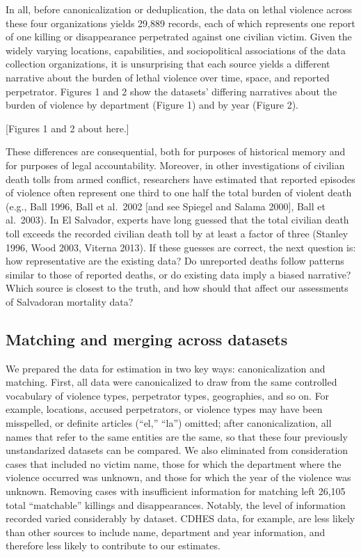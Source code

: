 \documentclass[11pt,]{article}
\begin{document}
In all, before canonicalization or deduplication, the data on lethal
violence across these four organizations yields 29,889 records, each of
which represents one report of one killing or disappearance perpetrated
against one civilian victim. Given the widely varying locations,
capabilities, and sociopolitical associations of the data collection
organizations, it is unsurprising that each source yields a different
narrative about the burden of lethal violence over time, space, and
reported perpetrator. Figures 1 and 2 show the datasets' differing
narratives about the burden of violence by department (Figure 1) and by
year (Figure 2).

{[}Figures 1 and 2 about here.{]}

These differences are consequential, both for purposes of historical
memory and for purposes of legal accountability. Moreover, in other
investigations of civilian death tolls from armed conflict, researchers
have estimated that reported episodes of violence often represent one
third to one half the total burden of violent death (e.g., Ball 1996,
Ball et al.~2002 {[}and see Spiegel and Salama 2000{]}, Ball et
al.~2003). In El Salvador, experts have long guessed that the total
civilian death toll exceeds the recorded civilian death toll by at least
a factor of three (Stanley 1996, Wood 2003, Viterna 2013). If these
guesses are correct, the next question is: how representative are the
existing data? Do unreported deaths follow patterns similar to those of
reported deaths, or do existing data imply a biased narrative? Which
source is closest to the truth, and how should that affect our
assessments of Salvadoran mortality data?

\hypertarget{matching-and-merging-across-datasets}{%
\subsection{Matching and merging across
datasets}\label{matching-and-merging-across-datasets}}

We prepared the data for estimation in two key ways: canonicalization
and matching. First, all data were canonicalized to draw from the same
controlled vocabulary of violence types, perpetrator types, geographies,
and so on. For example, locations, accused perpetrators, or violence
types may have been misspelled, or definite articles (``el,'' ``la'')
omitted; after canonicalization, all names that refer to the same
entities are the same, so that these four previously unstandarized
datasets can be compared. We also eliminated from consideration cases
that included no victim name, those for which the department where the
violence occurred was unknown, and those for which the year of the
violence was unknown. Removing cases with insufficient information for
matching left 26,105 total ``matchable'' killings and disappearances.
Notably, the level of information recorded varied considerably by
dataset. CDHES data, for example, are less likely than other sources to
include name, department and year information, and therefore less likely
to contribute to our estimates.
\end{document}
